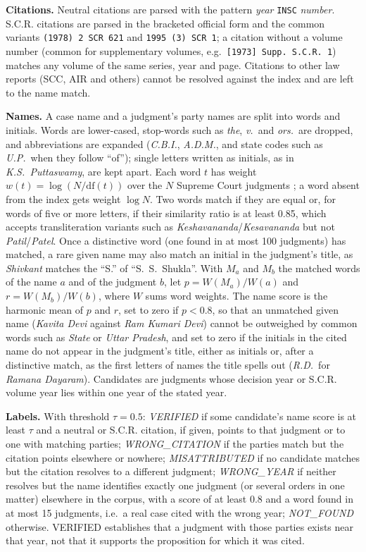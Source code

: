\documentclass[conference]{IEEEtran}
\begin{document}
\textbf{Citations.} Neutral citations are parsed with the pattern \emph{year} \texttt{INSC} \emph{number}. S.C.R. citations are parsed in the bracketed official form and the common variants \texttt{(1978) 2 SCR 621} and \texttt{1995 (3) SCR 1}; a citation without a volume number (common for supplementary volumes, e.g.\ \texttt{[1973] Supp.\ S.C.R.~1}) matches any volume of the same series, year and page. Citations to other law reports (SCC, AIR and others) cannot be resolved against the index and are left to the name match.

\textbf{Names.} A case name and a judgment's party names are split into words and initials. Words are lower-cased, stop-words such as \emph{the}, \emph{v.}\ and \emph{ors.}\ are dropped, and abbreviations are expanded (\emph{C.B.I.}, \emph{A.D.M.}, and state codes such as \emph{U.P.}\ when they follow ``of''); single letters written as initials, as in \emph{K.S.\ Puttaswamy}, are kept apart. Each word $t$ has weight $w(t)=\log(N/\mathrm{df}(t))$ over the $N$ Supreme Court judgments \cite{sparckjones}; a word absent from the index gets weight $\log N$. Two words match if they are equal or, for words of five or more letters, if their similarity ratio \cite{difflib} is at least 0.85, which accepts transliteration variants such as \emph{Keshavananda}/\emph{Kesavananda} but not \emph{Patil}/\emph{Patel}. Once a distinctive word (one found in at most 100 judgments) has matched, a rare given name may also match an initial in the judgment's title, as \emph{Shivkant} matches the ``S.'' of ``S.~S.~Shukla''. With $M_a$ and $M_b$ the matched words of the name $a$ and of the judgment $b$, let $p=W(M_a)/W(a)$ and $r=W(M_b)/W(b)$, where $W$ sums word weights. The name score is the harmonic mean of $p$ and $r$, set to zero if $p<0.8$, so that an unmatched given name (\emph{Kavita Devi} against \emph{Ram Kumari Devi}) cannot be outweighed by common words such as \emph{State} or \emph{Uttar Pradesh}, and set to zero if the initials in the cited name do not appear in the judgment's title, either as initials or, after a distinctive match, as the first letters of names the title spells out (\emph{R.D.}\ for \emph{Ramana Dayaram}). Candidates are judgments whose decision year or S.C.R. volume year lies within one year of the stated year.

\textbf{Labels.} With threshold $\tau=0.5$:
\emph{VERIFIED} if some candidate's name score is at least $\tau$ and a neutral or S.C.R. citation, if given, points to that judgment or to one with matching parties;
\emph{WRONG\_CITATION} if the parties match but the citation points elsewhere or nowhere;
\emph{MISATTRIBUTED} if no candidate matches but the citation resolves to a different judgment;
\emph{WRONG\_YEAR} if neither resolves but the name identifies exactly one judgment (or several orders in one matter) elsewhere in the corpus, with a score of at least 0.8 and a word found in at most 15 judgments, i.e.\ a real case cited with the wrong year;
\emph{NOT\_FOUND} otherwise.
VERIFIED establishes that a judgment with those parties exists near that year, not that it supports the proposition for which it was cited.
\end{document}
